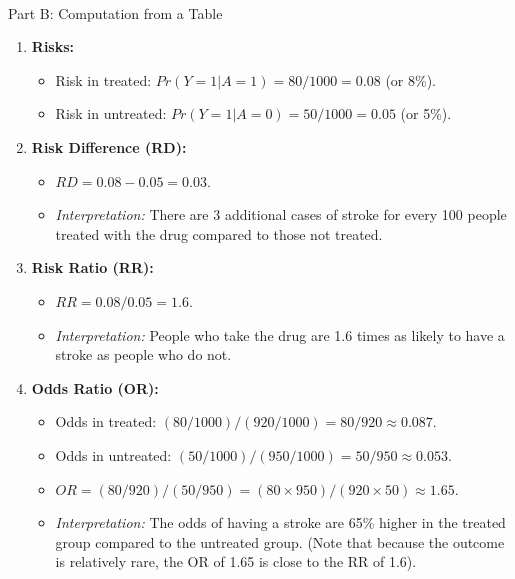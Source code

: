 \documentclass[
  10pt,
  letterpaper,
  DIV=11,
  numbers=noendperiod]{scrartcl}
\makeatletter
\let\oldparagraph\paragraph
\renewcommand{\paragraph}{
    \@ifstar
      \xxxParagraphStar
      \xxxParagraphNoStar
  }
\newcommand{\xxxParagraphStar}[1]{\oldparagraph*{#1}\mbox{}}
\newcommand{\xxxParagraphNoStar}[1]{\oldparagraph{#1}\mbox{}}
\providecommand{\tightlist}{%
  \setlength{\itemsep}{0pt}\setlength{\parskip}{0pt}}
\makeatother
\begin{document}
\paragraph{Part B: Computation from a
Table}\label{part-b-computation-from-a-table-1}

\begin{enumerate}
\def\labelenumi{\arabic{enumi}.}
\item
  \textbf{Risks:}

  \begin{itemize}
  \tightlist
  \item
    Risk in treated: \(Pr(Y=1|A=1) = 80 / 1000 = 0.08\) (or 8\%).
  \item
    Risk in untreated: \(Pr(Y=1|A=0) = 50 / 1000 = 0.05\) (or 5\%).
  \end{itemize}
\item
  \textbf{Risk Difference (RD):}

  \begin{itemize}
  \tightlist
  \item
    \(RD = 0.08 - 0.05 = 0.03\).
  \item
    \emph{Interpretation:} There are 3 additional cases of stroke for
    every 100 people treated with the drug compared to those not
    treated.
  \end{itemize}
\item
  \textbf{Risk Ratio (RR):}

  \begin{itemize}
  \tightlist
  \item
    \(RR = 0.08 / 0.05 = 1.6\).
  \item
    \emph{Interpretation:} People who take the drug are 1.6 times as
    likely to have a stroke as people who do not.
  \end{itemize}
\item
  \textbf{Odds Ratio (OR):}

  \begin{itemize}
  \tightlist
  \item
    Odds in treated: \((80/1000) / (920/1000) = 80/920 \approx 0.087\).
  \item
    Odds in untreated:
    \((50/1000) / (950/1000) = 50/950 \approx 0.053\).
  \item
    \(OR = (80/920) / (50/950) = (80 \times 950) / (920 \times 50) \approx 1.65\).
  \item
    \emph{Interpretation:} The odds of having a stroke are 65\% higher
    in the treated group compared to the untreated group. (Note that
    because the outcome is relatively rare, the OR of 1.65 is close to
    the RR of 1.6).
  \end{itemize}
\end{enumerate}
\end{document}

